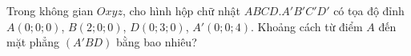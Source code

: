 \begin{ex}
Trong không gian $Oxyz$, cho hình hộp chữ nhật $ABCD.A'B'C'D'$ có tọa độ đỉnh $A(0;0;0)$, $B(2;0;0)$, $D(0;3;0)$, $A'(0;0;4)$. Khoảng cách từ điểm $A$ đến mặt phẳng $(A'BD)$ bằng bao nhiêu?
\end{ex}
